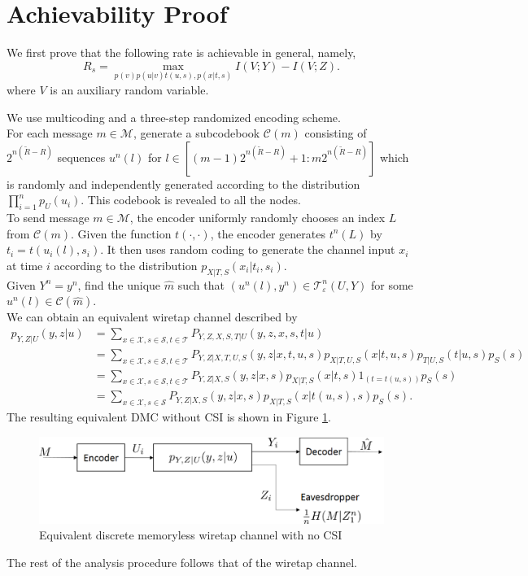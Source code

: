 \documentclass[12pt, Draft, onecolumn]{IEEEtran}
\def\calC{{\mathcal{C}}}
\def\calM{{\mathcal{M}}}
\def\calS{{\mathcal{S}}}
\def\calX{{\mathcal{X}}}
\def\calT{{\mathcal{T}}}
\begin{document}
\section{Achievability Proof}
We first prove that the following rate is achievable in general, namely,
\begin{equation}\label{eq.achievable}
R_s = \max_{p(v)p(u|v)t(u,s),p(x|t,s)} I(V;Y)-I(V;Z).
\end{equation}
where $V$ is an auxiliary random variable.

We use multicoding and a three-step randomized encoding scheme.\\

 For each message $m\in \calM$, generate a subcodebook $\calC(m)$ consisting of $2^{n(\tilde{R}-R)}$ sequences $u^n(l)$ for $l\in [(m-1)2^{n(\tilde{R}-R)}+1:m2^{n(\tilde{R}-R)}]$ which is randomly and independently generated according to the distribution $\prod_{i=1}^n p_U(u_i)$. This codebook is revealed to all the nodes.\\

 To send message $m\in\calM$, the encoder uniformly randomly chooses an index $L$ from $\calC(m)$. Given the function $t(\cdot,\cdot)$, the encoder generates $t^n(L)$ by $t_i=t(u_i(l),s_i)$. It then uses random coding to generate the channel input $x_i$ at time $i$ according to the distribution $p_{X|T,S}(x_i|t_i,s_i)$.\\

 Given $Y^n=y^n$, find the unique $\hat{m}$ such that $(u^n(l), y^n)\in\calT^n_{\varepsilon}(U,Y)$ for some $u^n(l)\in\calC(\hat{m})$.\\

 We can obtain an equivalent wiretap channel described by
\begin{align*}
p_{Y,Z|U}(y,z|u) &= \sum_{x\in\calX, s\in\calS, t\in\calT}P_{Y,Z,X,S,T|U}(y,z,x,s,t|u)\\
&= \sum_{x\in\calX, s\in\calS, t\in\calT}P_{Y,Z|X,T,U,S}(y,z|x,t,u,s)p_{X|T,U,S}(x|t,u,s)p_{T|U,S}(t|u,s)p_S(s)\\
&= \sum_{x\in\calX, s\in\calS, t\in\calT}P_{Y,Z|X,S}(y,z|x,s)p_{X|T,S}(x|t,s)1_{(t=t(u,s))}p_{S}(s)\\
&= \sum_{x\in\calX, s\in\calS}P_{Y,Z|X,S}(y,z|x,s)p_{X|T,S}(x|t(u,s),s)p_{S}(s).
\end{align*}
The resulting equivalent DMC without CSI is shown in Figure \ref{fig.secrecy_noCSIR_channel_equivalent}.
\begin{figure}[h]
\centering
\includegraphics[scale=.6]{figs/secrecy_noCSIR_channel_equivalent}
\caption{Equivalent discrete memoryless wiretap channel with no CSI}
\label{fig.secrecy_noCSIR_channel_equivalent}
\end{figure}
The rest of the analysis procedure follows that of the wiretap channel.
\end{document}
